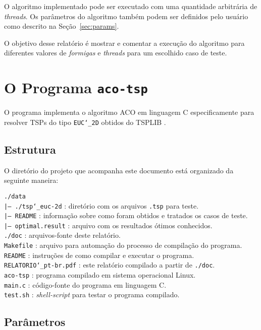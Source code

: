 \documentclass[a4paper, twoside, 12pt]{article}
\begin{document}
O algoritmo implementado pode ser executado com uma quantidade arbitrária de \textit{threads}. Os parâmetros do algoritmo também podem ser definidos pelo usuário como descrito na Seção~\ref{sec:params}.

O objetivo desse relatório é mostrar e comentar a execução do algoritmo para diferentes valores de \textit{formigas} e \textit{threads} para um escolhido caso de teste.

\section{O Programa \texttt{aco-tsp} \label{sec:prog}}

O programa implementa o algoritmo ACO em linguagem C especificamente para resolver TSPs do tipo \texttt{EUC\char`_2D} obtidos do TSPLIB \cite{bib:tsplib}.

\subsection{Estrutura}

O diretório do projeto que acompanha este documento está organizado da seguinte maneira:

\indent\texttt{./data}\\
\indent\indent\texttt{|-- ./tsp\char`_euc-2d} : diretório com os arquivos \texttt{.tsp} para teste.\\
\indent\indent\texttt{|-- README} : informação sobre como foram obtidos e tratados os casos de teste.\\
\indent\indent\texttt{|-- optimal.result} : arquivo com os resultados ótimos conhecidos.\\
\indent\texttt{./doc} : arquivos-fonte deste relatório.\\
\indent\texttt{Makefile} : arquivo para automação do processo de compilação do programa.\\
\indent\texttt{README} : instruções de como compilar e executar o programa.\\
\indent\texttt{RELATORIO\char`_pt-br.pdf} : este relatório compilado a partir de \texttt{./doc}.\\
\indent\texttt{aco-tsp} : programa compilado em sistema operacional Linux.\\
\indent\texttt{main.c} : código-fonte do programa em linguagem C.\\
\indent\texttt{test.sh} : \textit{shell-script} para testar o programa compilado.

\subsection{Parâmetros \label{sec:params}}
\end{document}
